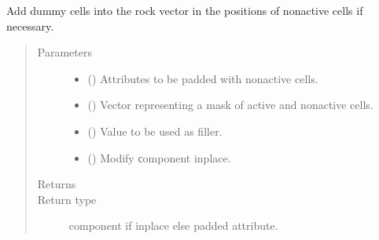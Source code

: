 \documentclass[letterpaper,10pt,english]{sphinxmanual}
\begin{document}
\begin{fulllineitems}
\begin{fulllineitems}
\label{\detokenize{api/rock:geology.src.Rock.pad_na}}
Add dummy cells into the rock vector in the positions of non\sphinxhyphen{}active cells if necessary.
\begin{quote}\begin{description}
\item[{Parameters}] \leavevmode\begin{itemize}
\item {} 
 (\sphinxstyleliteralemphasis{\sphinxupquote{, }}) \textendash{} Attributes to be padded with non\sphinxhyphen{}active cells.

\item {} 
 () \textendash{} Vector representing a mask of active and non\sphinxhyphen{}active cells.

\item {} 
 () \textendash{} Value to be used as filler.

\item {} 
 () \textendash{} Modify сomponent inplace.

\end{itemize}

\item[{Returns}] \leavevmode
{}

\item[{Return type}] \leavevmode
component if inplace else padded attribute.

\end{description}\end{quote}

\end{fulllineitems}


\end{fulllineitems}
\end{document}
